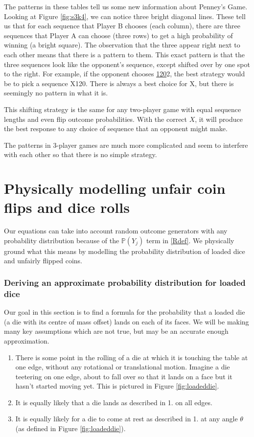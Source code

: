 \documentclass[english,12pt,a4paper,final]{article}
\begin{document}
The patterns in these tables tell us some new information about Penney's Game. Looking at Figure \ref{fig:s3k4}, we can notice three bright diagonal lines. These tell us that for each sequence that Player B chooses (each column), there are three sequences that Player A can choose (three rows) to get a high probability of winning (a bright square). The observation that the three appear right next to each other means that there is a pattern to them. This exact pattern is that the three sequences look like the opponent's sequence, except shifted over by one spot to the right. For example, if the opponent chooses \underline{120}2, the best strategy would be to pick a sequence X120. There is always a best choice for X, but there is seemingly no pattern in what it is. 

This shifting strategy is the same for any two-player game with equal sequence lengths and even flip outcome probabilities. With the correct $X$, it will produce the best response to any choice of sequence that an opponent might make.

The patterns in 3-player games are much more complicated and seem to interfere with each other so that there is no simple strategy.

\part {Physically modelling unfair coin flips and dice rolls \label{physicalModelling}}

Our equations can take into account random outcome generators with any probability distribution because of the $\mathbb{P}(Y_j)$ term in \eqref{Rdef}. We physically ground what this means by modelling the probability distribution of loaded dice and unfairly flipped coins.

\section{Deriving an approximate probability distribution for loaded dice}

Our goal in this section is to find a formula for the probability that a loaded die (a die with its centre of mass offset) lands on each of its faces. We will be making many key assumptions which are not true, but may be an accurate enough approximation.

\begin{enumerate}
	\item There is some point in the rolling of a die at which it is touching the table at one edge, without any rotational or translational motion. Imagine a die teetering on one edge, about to fall over so that it lands on a face but it hasn't started moving yet. This is pictured in Figure \ref{fig:loadeddie}.
	\item It is equally likely that a die lands as described in 1. on all edges.
	\item It is equally likely for a die to come at rest as described in 1. at any angle $\theta$ (as defined in Figure \ref{fig:loadeddie}).
\end{enumerate}
\end{document}
